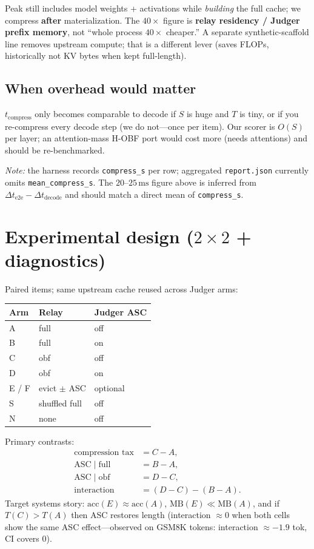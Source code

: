 \documentclass[11pt]{article}
\begin{document}
Peak still includes model weights + activations while \emph{building} the full
cache; we compress \textbf{after} materialization. The $40\times$ figure is
\textbf{relay residency / Judger prefix memory}, not ``whole process $40\times$
cheaper.'' A separate synthetic-scaffold line removes upstream compute; that is
a different lever (saves FLOPs, historically not KV bytes when kept
full-length).

\subsection{When overhead would matter}

$t_{\mathrm{compress}}$ only becomes comparable to decode if $S$ is huge and
$T$ is tiny, or if you re-compress every decode step (we do not---once per
item). Our scorer is $O(S)$ per layer; an attention-mass H-OBF port would cost
more (needs attentions) and should be re-benchmarked.

\textit{Note:} the harness records \texttt{compress\_s} per row; aggregated
\texttt{report.json} currently omits \texttt{mean\_compress\_s}. The
$20$--$25\,\mathrm{ms}$ figure above is inferred from
$\Delta t_{\mathrm{e2e}}-\Delta t_{\mathrm{decode}}$ and should match a direct
mean of \texttt{compress\_s}.

\section{Experimental design ($2\times 2$ + diagnostics)}

Paired items; same upstream cache reused across Judger arms:

\begin{center}
\begin{tabular}{@{}lll@{}}
\toprule
Arm & Relay & Judger ASC \\
\midrule
A & full & off \\
B & full & on \\
C & obf & off \\
D & obf & on \\
E / F & evict $\pm$ ASC & optional \\
S & shuffled full & off \\
N & none & off \\
\bottomrule
\end{tabular}
\end{center}

Primary contrasts:
\begin{align*}
\text{compression tax} &= C - A,\\
\text{ASC}\mid\mathrm{full} &= B - A,\\
\text{ASC}\mid\mathrm{obf} &= D - C,\\
\text{interaction} &= (D-C)-(B-A).
\end{align*}
Target systems story: $\mathrm{acc}(E)\approx\mathrm{acc}(A)$,
$\mathrm{MB}(E)\ll\mathrm{MB}(A)$, and if $T(C)>T(A)$ then ASC restores length
(interaction $\approx 0$ when both cells show the same ASC effect---observed on
GSM8K tokens: interaction $\approx -1.9$ tok, CI covers $0$).
\end{document}
